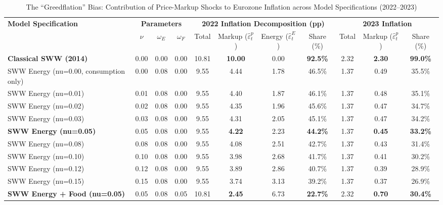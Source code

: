 \begin{table}[H]
\centering
\small
\caption{The ``Greedflation'' Bias: Contribution of Price-Markup Shocks to Eurozone Inflation across Model Specifications (2022--2023)}
\label{tab:greedflation_bias}
\begin{tabular}{@{}l ccc cccc ccc@{}}
\toprule
\multirow{2}{*}{\textbf{Model Specification}} & \multicolumn{3}{c}{\textbf{Parameters}} & \multicolumn{4}{c}{\textbf{2022 Inflation Decomposition (pp)}} & \multicolumn{3}{c}{\textbf{2023 Inflation}} \\
\cmidrule(lr){2-4} \cmidrule(lr){5-8} \cmidrule(l){9-11}
 & $\nu$ & $\omega_E$ & $\omega_F$ & Total & Markup ($\hat{\varepsilon}_t^p$) & Energy ($\hat{\varepsilon}_t^E$) & Share (\%) & Total & Markup ($\hat{\varepsilon}_t^p$) & Share (\%) \\
\midrule
\textbf{Classical SWW (2014)} & 0.00 & 0.00 & 0.00 & 10.81 & \textbf{10.00} & 0.00 & \textbf{92.5\%} & 2.32 & \textbf{2.30} & \textbf{99.0\%} \\
SWW Energy (nu=0.00, consumption only) & 0.00 & 0.08 & 0.00 & 9.55 & 4.44 & 1.78 & 46.5\% & 1.37 & 0.49 & 35.5\% \\
SWW Energy (nu=0.01) & 0.01 & 0.08 & 0.00 & 9.55 & 4.40 & 1.87 & 46.1\% & 1.37 & 0.48 & 35.1\% \\
SWW Energy (nu=0.02) & 0.02 & 0.08 & 0.00 & 9.55 & 4.35 & 1.96 & 45.6\% & 1.37 & 0.47 & 34.7\% \\
SWW Energy (nu=0.03) & 0.03 & 0.08 & 0.00 & 9.55 & 4.31 & 2.05 & 45.1\% & 1.37 & 0.47 & 34.2\% \\
\textbf{SWW Energy (nu=0.05)} & 0.05 & 0.08 & 0.00 & 9.55 & \textbf{4.22} & 2.23 & \textbf{44.2\%} & 1.37 & \textbf{0.45} & \textbf{33.2\%} \\
SWW Energy (nu=0.08) & 0.08 & 0.08 & 0.00 & 9.55 & 4.08 & 2.51 & 42.7\% & 1.37 & 0.43 & 31.4\% \\
SWW Energy (nu=0.10) & 0.10 & 0.08 & 0.00 & 9.55 & 3.98 & 2.68 & 41.7\% & 1.37 & 0.41 & 30.2\% \\
SWW Energy (nu=0.12) & 0.12 & 0.08 & 0.00 & 9.55 & 3.89 & 2.86 & 40.7\% & 1.37 & 0.39 & 28.9\% \\
SWW Energy (nu=0.15) & 0.15 & 0.08 & 0.00 & 9.55 & 3.74 & 3.13 & 39.2\% & 1.37 & 0.37 & 26.9\% \\
\textbf{SWW Energy + Food (nu=0.05)} & 0.05 & 0.08 & 0.05 & 10.81 & \textbf{2.45} & 6.73 & \textbf{22.7\%} & 2.32 & \textbf{0.70} & \textbf{30.4\%} \\
\bottomrule
\end{tabular}

\end{table}
